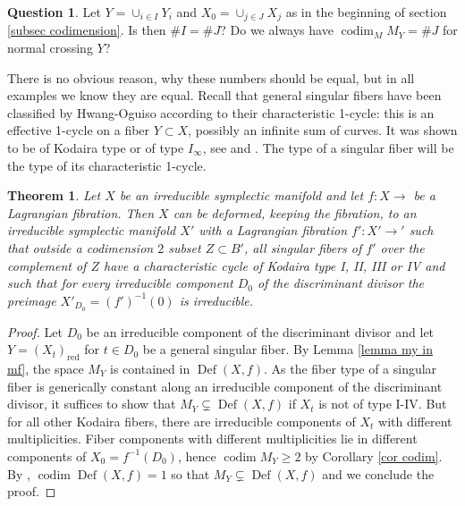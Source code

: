 \documentclass[a4paper,11pt,final]{amsart}
\theoremstyle{plain}
\newtheorem{theorem}[subsection]{Theorem}
\theoremstyle{definition}
\newtheorem{Que}[subsection]{Question}
\numberwithin{equation}{section}
\theoremstyle{remark}
\begin{document}
\begin{Que}
Let $Y=\cup_{i\in I} Y_i$ and $X_0=\cup_{j\in J} X_j$ as in the beginning of section \ref{subsec codimension}. Is then $\# I= \# J$? Do we always have ${\operatorname{codim}}_M M_Y  = \# J$ for normal crossing $Y$?
\end{Que}
There is no obvious reason, why these numbers should be equal, but in all examples we know they are equal. 
Recall that general singular fibers have been classified by Hwang-Oguiso according to their characteristic 1-cycle: this is an effective 1-cycle on a fiber $Y\subset X$, possibly an infinite sum of curves. It was shown to be of Kodaira type or of type $I_\infty$, see \cite[Theorem 1.4]{HO07}  and \cite[Theorem 2.4]{HO11}. The type of a singular fiber will be the type of its characteristic 1-cycle.
\begin{theorem}\label{theorem fibration}
Let $X$ be an irreducible symplectic manifold and let $f:X{\xrightarrow{\ \ }}$ be a Lagrangian fibration. Then $X$ can be deformed, keeping the fibration, to an irreducible symplectic manifold $X'$ with a Lagrangian fibration $f':X'{\xrightarrow{\ \ }}'$ such that outside a codimension $2$ subset $Z\subset B'$, all singular fibers of $f'$ over the complement of $Z$ have a characteristic cycle of Kodaira type I, II, III or IV and such that for every irreducible component $D_0$ of the discriminant divisor the preimage $X'_{D_0}=(f')^{-1}(0)$ is irreducible.
\end{theorem}
\begin{proof}
Let $D_0$ be an irreducible component of the discriminant divisor and let $Y=(X_t)_{{\operatorname{red}}}$ for $t\in D_0$ be a general singular fiber. By Lemma \ref{lemma my in mf}, the space $M_Y$ is contained in ${{\operatorname{Def}}}(X,f)$. As the fiber type of a singular fiber is generically constant along an irreducible component of the discriminant divisor, it suffices to show that $M_Y \subsetneq {{\operatorname{Def}}}(X,f)$ if $X_t$ is not of type I-IV. But for all other Kodaira fibers, there are irreducible components of $X_t$ with different multiplicities. Fiber components with different multiplicities lie in different components of $X_0=f^{-1}(D_0)$, hence ${\operatorname{codim}} M_Y \geq 2$ by Corollary \ref{cor codim}. By \cite[Corollary 1.2]{Matsus09}, ${\operatorname{codim}} {{\operatorname{Def}}}(X,f)=1$ so that $M_Y\subsetneq {{\operatorname{Def}}}(X,f)$ and we conclude the proof.
\end{proof}
\end{document}
